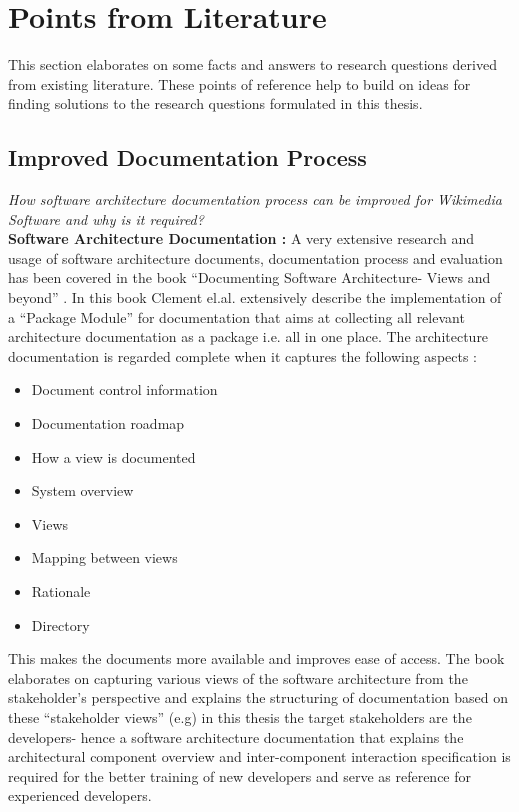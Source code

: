 \section{Points from Literature} 
\indent This section elaborates on some facts and answers to research questions derived from existing literature. These points of reference help to build on ideas for finding solutions to the research questions formulated in this thesis.
\subsection{Improved Documentation Process}
\indent \emph{How software architecture documentation process can be improved for
Wikimedia Software and why is it required?}
\newline
\\\indent \textbf{Software Architecture Documentation : } A very extensive research and usage of software architecture documents, documentation process and evaluation has been covered in the book \enquote{Documenting Software Architecture- Views and beyond} \cite{BachmannDocumentingSoftware2010}. In this book Clement el.al. extensively describe the implementation of a \enquote{Package Module} for documentation that aims at collecting all relevant architecture documentation as a package i.e. all in one place. The architecture documentation is regarded complete when it captures the following aspects :
\begin{itemize}
\item Document control information 
\item Documentation roadmap 
\item How a view is documented
\item System overview 
\item Views 
\item Mapping between views 
\item Rationale
\item Directory
\end{itemize}
This makes the documents more available and improves ease of access. The book elaborates on capturing various views of the software architecture from the stakeholder's perspective and explains the structuring of documentation based on these \enquote{stakeholder views} (e.g) in this thesis the target stakeholders are the developers- hence a software architecture documentation that explains the architectural component overview and inter-component interaction specification is required for the better training of new developers and serve as reference for experienced developers.
